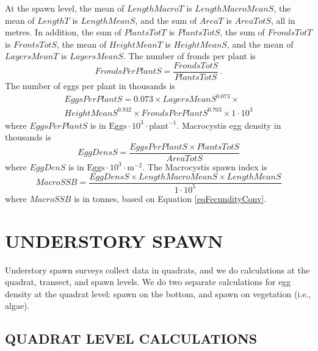 \documentclass[12pt]{article}
\begin{document}
At the spawn level, the mean of $LengthMacroT$ is $LengthMacroMeanS$, the mean of $LengthT$ is $LengthMeanS$, and the sum of $AreaT$ is $AreaTotS$, all in metres.
In addition, the sum of $PlantsTotT$ is $PlantsTotS$, the sum of $FrondsTotT$ is $FrontsTotS$, the mean of $HeightMeanT$ is $HeightMeanS$, and the mean of $LayersMeanT$ is $LayersMeanS$. 
The number of fronds per plant is
\begin{equation}
FrondsPerPlantS = \frac{FrondsTotS} {PlantsTotS} \, .
\label{eqFrondsPerPlant}
\end{equation}
The number of eggs per plant in thousands is \citep{HaegeleSchweigert1990}
\begin{multline}
EggsPerPlantS = 0.073 \times LayersMeanS^{0.673} \times \\ 
HeightMeanS^{0.932} \times FrondsPerPlantS^{0.703} \times 1 \cdot 10^{3}
\label{eqEggsPerPlantMacro}
\end{multline}
where $EggsPerPlantS$ is in $\text{Eggs} \cdot 10^{3} \cdot \text{plant}^{-1}$. 
Macrocystis egg density in thousands is
\begin{equation}
EggDensS = \frac{EggsPerPlantS \times PlantsTotS} {AreaTotS}
\label{eqEggDensityMacro}
\end{equation}
where $EggDenS$ is in $\text{Eggs} \cdot 10^{3} \cdot \text{m}^{-2}$.
The Macrocystis spawn index is
\begin{equation}
MacroSSB = \frac{EggDensS \times LengthMacroMeanS \times LengthMeanS} {1 \cdot 10^{5}}
\label{eqBiomassMacro}
\end{equation}
where $MacroSSB$ is in tonnes, based on Equation \ref{eqFecundityConv}.

\section{UNDERSTORY SPAWN}

Understory spawn surveys collect data in quadrats, and we do calculations at the quadrat, transect, and spawn levels.
We do two separate calculations for egg density at the quadrat level: spawn on the bottom, and spawn on vegetation (i.e., algae).

\subsection{QUADRAT LEVEL CALCULATIONS}
\end{document}
